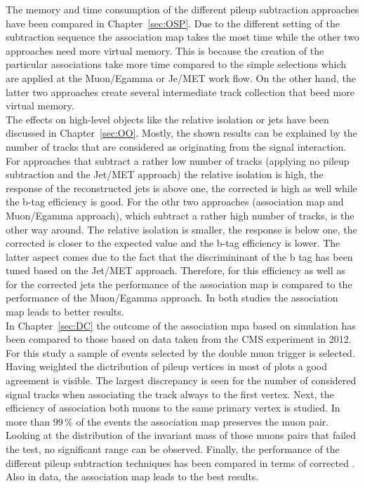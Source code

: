 The memory and time consumption of the different pileup subtraction approaches have been compared in Chapter~\ref{sec:OSP}. Due to the different setting of the subtraction sequence the association map takes the most time while the other two approaches need more virtual memory. This is because the creation of the particular associations take more time compared to the simple selections which are applied at the Muon/Egamma or Je/MET work flow. On the other hand, the latter two approaches create several intermediate track collection that beed more virtual memory. \\
The effects on high-level objects like the relative isolation or jets have been discussed in Chapter~\ref{sec:OO}. Mostly, the shown results can be explained by the number of tracks that are considered as originating from the signal interaction. For approaches that subtract a rather low number of tracks (applying no pileup subtraction and the Jet/MET approach) the relative isolation is high, the \pt{} response of the reconstructed jets is above one, the corrected \MET{} is high as well while the b-tag efficiency is good. For the othr two approaches (association map and Muon/Egamma approach), which subtract a rather high number of tracks, is the other way around. The relative isolation is smaller, the \pt response is below one, the corrected \MET{} is closer to the expected value and the b-tag efficiency is lower. The latter aspect comes due to the fact that the discrimininant of the b tag has been tuned based on the Jet/MET approach. Therefore, for this efficiency as well as for the corrected jets the performance of the association map is compared to the performance of the Muon/Egamma approach. In both studies the association map leads to better results. \\
In Chapter~\ref{sec:DC} the outcome of the association mpa based on simulation has been compared to those based on data taken from the CMS experiment in 2012. For this study a sample of events selected by the double muon trigger is selected. Having weighted the dictribution of pileup vertices in most of plots a good agreement is visible. The largest discrepancy is seen for the number of considered signal tracks when associating the track always to the first vertex. Next, the efficiency of association both muons to the same primary vertex is studied. In more than $99\,\%$ of the events the association map preserves the muon pair. Looking at the distribution of the invariant mass of those muons pairs that failed the test, no significant range can be observed. Finally, the performance of the different pileup subtraction techniques has been compared in terms of corrected \MET{}. Also in data, the association map leads to the best results. \\
